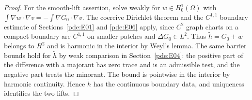 \documentclass[11pt,oneside,openany]{book}
\theoremstyle{plain}
\theoremstyle{definition}
\theoremstyle{remark}
\begin{document}
\begin{proof}
For the smooth-lift assertion, solve weakly for
\(w\in H^1_0(\Omega)\) with
\(\int\nabla w\cdot\nabla v=-\int\nabla G_0\cdot\nabla v\).
The coercive Dirichlet theorem and the \(C^{1,1}\) boundary
estimate of Sections~\ref{pde:E01} and \ref{pde:E06}
apply, since \(C^2\) graph charts on a compact boundary
are \(C^{1,1}\) on smaller patches and \(\Delta G_0\in L^2\).
Thus \(\widetilde h=G_0+w\) belongs to \(H^2\) and is
harmonic in the interior by Weyl's lemma.
The same barrier bounds hold for \(\widetilde h\) by weak
comparison in Section~\ref{pde:E04}: the positive part of
the difference with a majorant has zero trace and is an
admissible test, and the negative part treats the minorant.
The bound is pointwise in the interior by harmonic
continuity. Hence \(\widetilde h\) has the continuous
boundary data, and uniqueness identifies the two lifts.
\end{proof}
\end{document}
